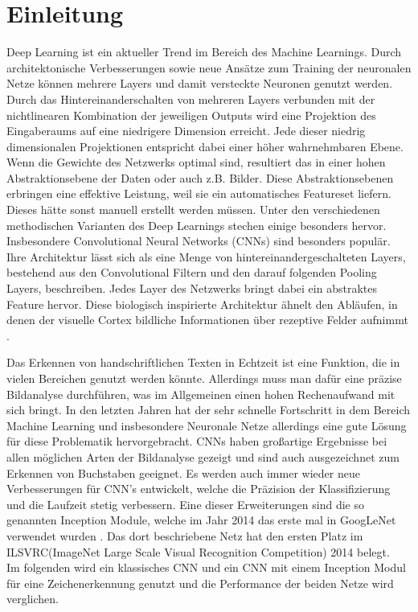 \documentclass[runningheads,a4paper]{llncs}[2015/06/24]
\begin{document}
\section{Einleitung}\label{sec:intro}
Deep Learning ist ein aktueller Trend im Bereich des Machine Learnings. Durch architektonische Verbesserungen sowie neue Ansätze zum Training der neuronalen Netze können mehrere Layers und damit versteckte Neuronen genutzt werden. Durch das Hintereinanderschalten von mehreren Layers verbunden mit der nichtlinearen Kombination der jeweiligen Outputs wird eine Projektion des Eingaberaums auf eine niedrigere Dimension erreicht. Jede dieser niedrig dimensionalen Projektionen entspricht dabei einer höher wahrnehmbaren Ebene. Wenn die Gewichte des Netzwerks optimal sind, resultiert das in einer hohen Abstraktionsebene der Daten oder auch z.B. Bilder. Diese Abstraktionsebenen erbringen eine effektive Leistung, weil sie ein automatisches Featureset liefern. Dieses hätte sonst manuell erstellt werden müssen. Unter den verschiedenen methodischen Varianten des Deep Learnings stechen einige besonders hervor. Insbesondere Convolutional Neural Networks (CNNs) sind besonders populär. Ihre Architektur lässt sich als eine Menge von hintereinandergeschalteten Layers, bestehend aus den Convolutional Filtern und den darauf folgenden Pooling Layers, beschreiben. Jedes Layer des Netzwerks bringt dabei ein abstraktes Feature hervor. Diese biologisch inspirierte Architektur ähnelt den Abläufen, in denen der visuelle Cortex bildliche Informationen über rezeptive Felder aufnimmt \cite{ravi}.

Das Erkennen von handschriftlichen Texten in Echtzeit ist eine Funktion, die in vielen Bereichen genutzt werden könnte. Allerdings muss man dafür eine präzise Bildanalyse durchführen, was im Allgemeinen einen hohen Rechenaufwand mit sich bringt. In den letzten Jahren hat der sehr schnelle Fortschritt in dem Bereich Machine Learning und insbesondere Neuronale Netze allerdings eine gute Lösung für diese Problematik hervorgebracht. CNNs haben großartige Ergebnisse bei allen möglichen Arten der Bildanalyse gezeigt und sind auch ausgezeichnet zum Erkennen von Buchstaben geeignet. Es werden auch immer wieder neue Verbesserungen für CNN's entwickelt, welche die Präzision der Klassifizierung und die Laufzeit stetig verbessern. Eine dieser Erweiterungen sind die so genannten Inception Module, welche im Jahr 2014 das erste mal in GoogLeNet verwendet wurden \cite{inception_paper}. Das dort beschriebene Netz hat den ersten Platz im ILSVRC(ImageNet Large Scale Visual Recognition Competition) 2014 belegt\cite{ILSVRC2014}.\\
Im folgenden wird ein klassisches CNN und ein CNN mit einem Inception Modul für eine Zeichenerkennung genutzt und die Performance der beiden Netze wird verglichen.\\
\end{document}
